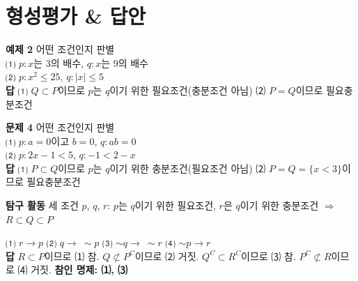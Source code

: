 \documentclass[11pt,a4paper]{article}
\begin{document}
\section{형성평가 \& 답안}
\begin{minipage}[t]{0.48\linewidth}
\begin{answerbox}
\textbf{예제 2} \quad 어떤 조건인지 판별\\
\small ⑴ $p:x$는 3의 배수, $q:x$는 9의 배수\\
⑵ $p:x^2\le25$, $q:|x|\le5$\\[4pt]
\textbf{\color{goldstrong}답} \; ⑴ $Q\subset P$이므로 $p$는 $q$이기 위한 필요조건(충분조건 아님) \quad ⑵ $P=Q$이므로 필요충분조건
\end{answerbox}
\end{minipage}\hfill
\begin{minipage}[t]{0.48\linewidth}
\begin{answerbox}
\textbf{문제 4} \quad 어떤 조건인지 판별\\
\small ⑴ $p:a=0$이고 $b=0$, $q:ab=0$\\
⑵ $p:2x-1<5$, $q:-1<2-x$\\[4pt]
\textbf{\color{goldstrong}답} \; ⑴ $P\subset Q$이므로 $p$는 $q$이기 위한 충분조건(필요조건 아님) \quad ⑵ $P=Q=\{x<3\}$이므로 필요충분조건
\end{answerbox}
\end{minipage}

\vspace{6pt}
\begin{answerbox}
\textbf{탐구 활동} \quad 세 조건 $p$, $q$, $r$: $p$는 $q$이기 위한 필요조건, $r$은 $q$이기 위한 충분조건 $\Rightarrow$ $R\subset Q\subset P$

\vspace{4pt}
\begin{center}
\end{center}

\small ⑴ $r\to p$ ⑵ $q\to\ \sim\!p$ ⑶ $\sim\!q\to\ \sim\!r$ ⑷ $\sim\!p\to r$\\[4pt]
\textbf{\color{goldstrong}답} \; $R\subset P$이므로 ⑴ 참. $Q\not\subset P^C$이므로 ⑵ 거짓. $Q^C\subset R^C$이므로 ⑶ 참. $P^C\not\subset R$이므로 ⑷ 거짓. \textbf{참인 명제: ⑴, ⑶}
\end{answerbox}
\end{document}
